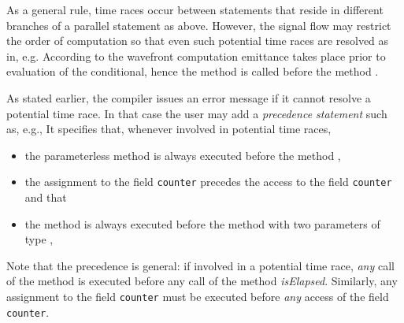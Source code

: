 As a general rule, time races occur between statements that reside in different branches of a parallel statement as above. However, the signal flow may restrict the order of computation so that even such potential time
races are resolved as in, e.g.
%
%    
According to the wavefront computation
emittance takes place prior to evaluation of the conditional,
 hence the method  is called
before the method .

As stated earlier, the compiler issues an error message if it cannot
resolve a potential time race. In that case the user may add a \emph{precedence statement} such as, e.g.,
It specifies that, whenever involved in potential time races,
\begin{itemize}
\item the parameterless method  is always executed before the method ,

\item the assignment to the field \texttt{counter} precedes the access to
the field \texttt{counter} and that

\item the method   is always executed before the method  with two parameters of type , 
\end{itemize}

Note that the precedence is general: if involved in
a potential time race, \emph{any} call of the method  is
executed before any call of the method \textit{isElapsed}. Similarly,
any assignment to the field
\texttt{counter} must be executed before \emph{any} access of
    the field \texttt{counter}.

